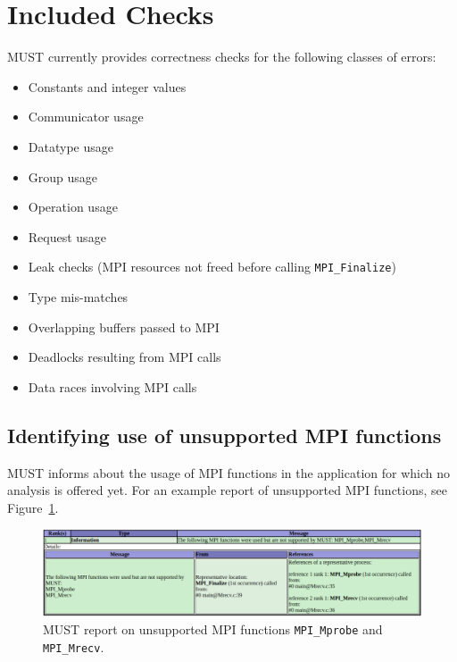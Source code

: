 \documentclass[english]{scrartcl}
\begin{document}
\section{Included Checks}
MUST currently provides correctness checks for the following classes of errors:
\begin{itemize}
  \item Constants and integer values
  \item Communicator usage
  \item Datatype usage
  \item Group usage
  \item Operation usage
  \item Request usage
  \item Leak checks (MPI resources not freed before
  calling \texttt{MPI\_Finalize})
  \item Type mis-matches
  \item Overlapping buffers passed to MPI
  \item Deadlocks resulting from MPI calls
  \item Data races involving MPI calls
\end{itemize}

\subsection{Identifying use of unsupported MPI functions}
MUST informs about the usage of MPI functions in the application for which no analysis is offered yet.
For an example report of unsupported MPI functions, see Figure~\ref{unsupported-report}.

\begin{figure}[tp]
  \centering
  \includegraphics[angle=0,width=0.99\linewidth]{unsupported_example.pdf}
    \caption{MUST report on unsupported MPI functions \texttt{MPI\_Mprobe} and \texttt{MPI\_Mrecv}.}
  \label{unsupported-report}
\end{figure}
\end{document}
